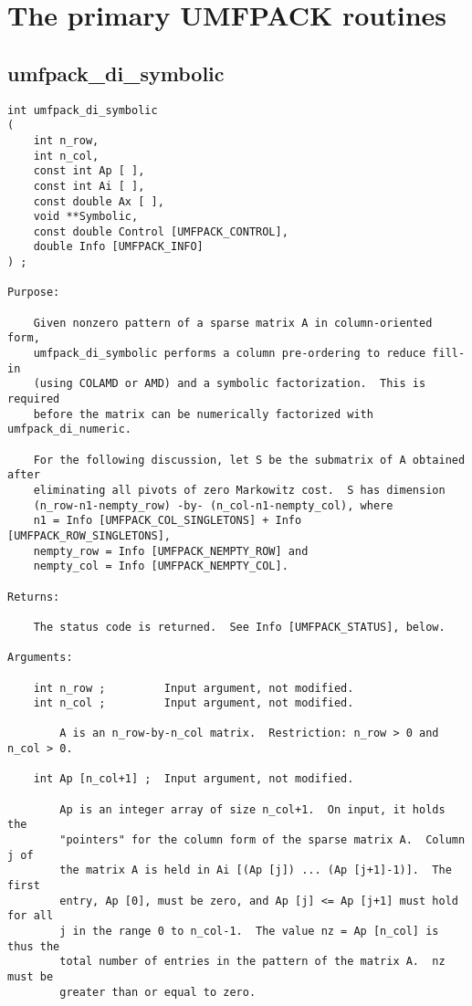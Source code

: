 \documentclass[11pt]{article}
\begin{document}
\section{The primary UMFPACK routines}
\label{Primary}

\subsection{umfpack\_di\_symbolic}

{\footnotesize
\begin{verbatim}
int umfpack_di_symbolic
(
    int n_row,
    int n_col,
    const int Ap [ ],
    const int Ai [ ],
    const double Ax [ ],
    void **Symbolic,
    const double Control [UMFPACK_CONTROL],
    double Info [UMFPACK_INFO]
) ;

Purpose:

    Given nonzero pattern of a sparse matrix A in column-oriented form,
    umfpack_di_symbolic performs a column pre-ordering to reduce fill-in
    (using COLAMD or AMD) and a symbolic factorization.  This is required
    before the matrix can be numerically factorized with umfpack_di_numeric.

    For the following discussion, let S be the submatrix of A obtained after
    eliminating all pivots of zero Markowitz cost.  S has dimension
    (n_row-n1-nempty_row) -by- (n_col-n1-nempty_col), where
    n1 = Info [UMFPACK_COL_SINGLETONS] + Info [UMFPACK_ROW_SINGLETONS],
    nempty_row = Info [UMFPACK_NEMPTY_ROW] and
    nempty_col = Info [UMFPACK_NEMPTY_COL].

Returns:

    The status code is returned.  See Info [UMFPACK_STATUS], below.

Arguments:

    int n_row ;         Input argument, not modified.
    int n_col ;         Input argument, not modified.

        A is an n_row-by-n_col matrix.  Restriction: n_row > 0 and n_col > 0.

    int Ap [n_col+1] ;  Input argument, not modified.

        Ap is an integer array of size n_col+1.  On input, it holds the
        "pointers" for the column form of the sparse matrix A.  Column j of
        the matrix A is held in Ai [(Ap [j]) ... (Ap [j+1]-1)].  The first
        entry, Ap [0], must be zero, and Ap [j] <= Ap [j+1] must hold for all
        j in the range 0 to n_col-1.  The value nz = Ap [n_col] is thus the
        total number of entries in the pattern of the matrix A.  nz must be
        greater than or equal to zero.


\end{verbatim}}
\end{document}
